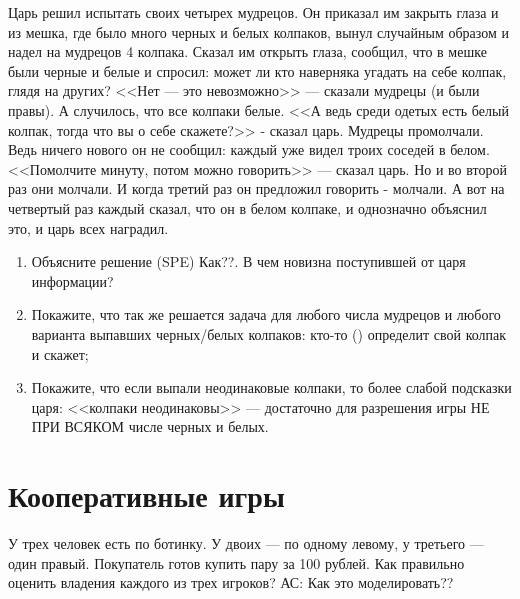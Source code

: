 \begin{problem} [Колпаки]
\begin{source} \cite{myerson:gtac} \end{source}
 Царь решил испытать своих
четырех мудрецов. Он приказал им закрыть глаза и из мешка,
где было много черных и белых колпаков, вынул случайным
образом и надел на мудрецов 4 колпака. Сказал им открыть
глаза, сообщил, что в мешке были черные и белые и спросил:
может ли кто наверняка угадать на себе колпак, глядя на
других? <<Нет --- это невозможно>> --- сказали мудрецы (и были
правы). А случилось, что все колпаки белые. <<А ведь среди
одетых есть белый колпак, тогда что вы о себе скажете?>> -
сказал царь. Мудрецы промолчали. Ведь ничего нового он не
сообщил: каждый уже видел троих соседей в белом. <<Помолчите
минуту, потом можно говорить>> --- сказал царь. Но и во второй
раз они молчали. И когда третий раз он предложил говорить -
молчали. А вот на четвертый раз каждый сказал, что он в
белом колпаке, и однозначно объяснил это, и царь всех
наградил. 

\begin{enumerate} 

\item Объясните решение (SPE) {\red Как??}. В чем новизна
поступившей от царя информации? 

\item Покажите, что так же
решается задача для любого числа мудрецов и любого варианта
выпавших черных/белых колпаков: кто-то () определит свой
колпак и скажет;

\item Покажите, что если выпали неодинаковые
колпаки, то более слабой подсказки царя: <<колпаки
неодинаковы>> --- достаточно для разрешения игры НЕ ПРИ ВСЯКОМ
числе черных и белых.
\end{enumerate}



\begin{sol}

\end{sol}
\end{problem}






\section{Кооперативные игры}

\begin{problem}[Ботинки]
У трех человек есть по ботинку. У двоих --- по одному левому, у третьего --- один правый. Покупатель готов купить пару за 100 рублей. Как правильно оценить владения каждого из трех игроков?
{\red АС: Как это моделировать??}



\begin{sol}

\end{sol}
\end{problem}



